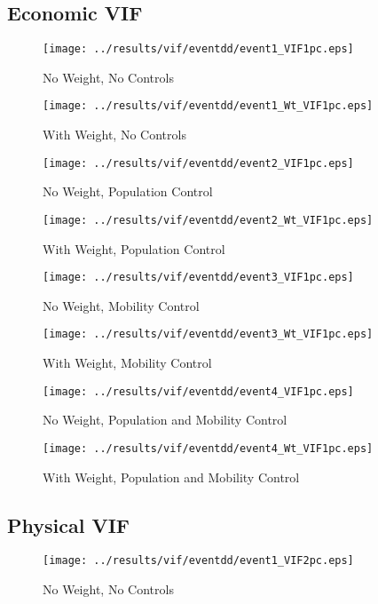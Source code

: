 \documentclass[11pt,letterpaper]{article}
\begin{document}
		\subsection{Economic VIF}
\begin{figure}[H]
\caption{No Weight, No Controls}
\centering
\texttt{[image: ../results/vif/eventdd/event1\_VIF1pc.eps]}
\end{figure}

\begin{figure}[H]
\caption{With Weight, No Controls}
\centering
\texttt{[image: ../results/vif/eventdd/event1\_Wt\_VIF1pc.eps]}
\end{figure}
\begin{figure}[H]
\caption{No Weight, Population Control}
\centering
\texttt{[image: ../results/vif/eventdd/event2\_VIF1pc.eps]}
\end{figure}

\begin{figure}[H]
\caption{With Weight, Population Control}
\centering
\texttt{[image: ../results/vif/eventdd/event2\_Wt\_VIF1pc.eps]}
\end{figure}
\begin{figure}[H]
\caption{No Weight, Mobility Control}
\centering
\texttt{[image: ../results/vif/eventdd/event3\_VIF1pc.eps]}
\end{figure}

\begin{figure}[H]
\caption{With Weight, Mobility Control}
\centering
\texttt{[image: ../results/vif/eventdd/event3\_Wt\_VIF1pc.eps]}
\end{figure}
\begin{figure}[H]
\caption{No Weight, Population and Mobility Control}
\centering
\texttt{[image: ../results/vif/eventdd/event4\_VIF1pc.eps]}
\end{figure}

\begin{figure}[H]
\caption{With Weight, Population and Mobility Control}
\centering
\texttt{[image: ../results/vif/eventdd/event4\_Wt\_VIF1pc.eps]}
\end{figure}
	
		\subsection{Physical VIF}
\begin{figure}[H]
\caption{No Weight, No Controls}
\centering
\texttt{[image: ../results/vif/eventdd/event1\_VIF2pc.eps]}
\end{figure}
\end{document}
